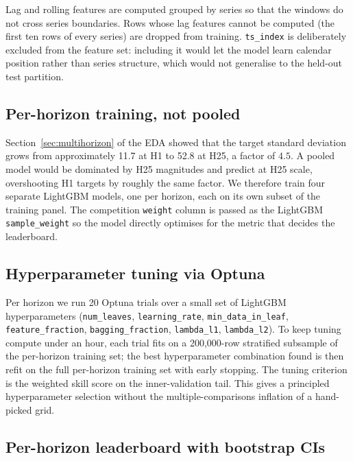 Lag and rolling features are computed grouped by series so that the windows do not cross series boundaries. Rows whose lag features cannot be computed (the first ten rows of every series) are dropped from training. \texttt{ts\_index} is deliberately excluded from the feature set: including it would let the model learn calendar position rather than series structure, which would not generalise to the held-out test partition.

\subsection{Per-horizon training, not pooled}
\label{sec:lgbm:per_horizon}

Section~\ref{sec:multihorizon} of the EDA showed that the target standard deviation grows from approximately 11.7 at H1 to 52.8 at H25, a factor of $4.5$. A pooled model would be dominated by H25 magnitudes and predict at H25 scale, overshooting H1 targets by roughly the same factor. We therefore train four separate LightGBM models, one per horizon, each on its own subset of the training panel. The competition \texttt{weight} column is passed as the LightGBM \texttt{sample\_weight} so the model directly optimises for the metric that decides the leaderboard.

\subsection{Hyperparameter tuning via Optuna}
\label{sec:lgbm:tuning}

Per horizon we run 20 Optuna trials over a small set of LightGBM hyperparameters (\texttt{num\_leaves}, \texttt{learning\_rate}, \texttt{min\_data\_in\_leaf}, \texttt{feature\_fraction}, \texttt{bagging\_fraction}, \texttt{lambda\_l1}, \texttt{lambda\_l2}). To keep tuning compute under an hour, each trial fits on a 200{,}000-row stratified subsample of the per-horizon training set; the best hyperparameter combination found is then refit on the full per-horizon training set with early stopping. The tuning criterion is the weighted skill score on the inner-validation tail. This gives a principled hyperparameter selection without the multiple-comparisons inflation of a hand-picked grid.

\subsection{Per-horizon leaderboard with bootstrap CIs}
\label{sec:lgbm:leaderboard}

